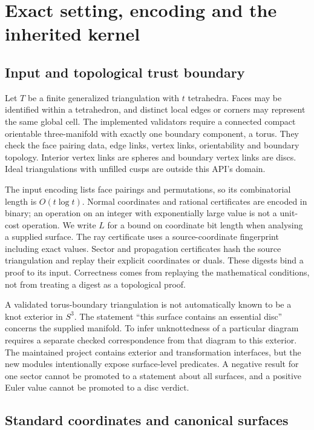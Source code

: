 \section{Exact setting, encoding and the inherited kernel}\label{sec:setting}

\subsection{Input and topological trust boundary}

Let $T$ be a finite generalized triangulation with $t$ tetrahedra. Faces may be identified within a tetrahedron, and distinct local edges or corners may represent the same global cell. The implemented validators require a connected compact orientable three-manifold with exactly one boundary component, a torus. They check the face pairing data, edge links, vertex links, orientability and boundary topology. Interior vertex links are spheres and boundary vertex links are discs. Ideal triangulations with unfilled cusps are outside this API's domain.

The input encoding lists face pairings and permutations, so its combinatorial length is $O(t\log t)$. Normal coordinates and rational certificates are encoded in binary; an operation on an integer with exponentially large value is not a unit-cost operation. We write $L$ for a bound on coordinate bit length when analysing a supplied surface. The ray certificate uses a source-coordinate fingerprint including exact values. Sector and propagation certificates hash the source triangulation and replay their explicit coordinates or duals. These digests bind a proof to its input. Correctness comes from replaying the mathematical conditions, not from treating a digest as a topological proof.

A validated torus-boundary triangulation is not automatically known to be a knot exterior in $S^3$. The statement ``this surface contains an essential disc'' concerns the supplied manifold. To infer unknottedness of a particular diagram requires a separate checked correspondence from that diagram to this exterior. The maintained project contains exterior and transformation interfaces, but the new modules intentionally expose surface-level predicates. A negative result for one sector cannot be promoted to a statement about all surfaces, and a positive Euler value cannot be promoted to a disc verdict.

\subsection{Standard coordinates and canonical surfaces}

